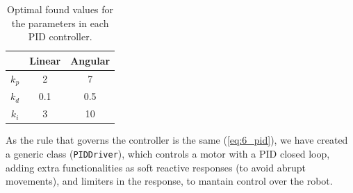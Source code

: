 			\begin{table}[h]
				\centering
				\begin{tabular}{|c|c|c|}
					\hline
					\textbf{} & \textbf{Linear} & \textbf{Angular} \\ \hline
					$k_p$     & 2               & 7                \\ \hline
					$k_d$     & 0.1             & 0.5              \\ \hline
					$k_i$     & 3               & 10               \\ \hline
				\end{tabular}
				\caption{Optimal found values for the parameters in each PID controller.}
				\label{tab:6_pids}
			\end{table}
			
			As the rule that governs the controller is the same (\autoref{eq:6_pid}), we have created a generic class (\texttt{PIDDriver}), which controls a motor with a PID closed loop, adding extra functionalities as soft reactive responses (to avoid abrupt movements), and limiters in the response, to mantain control over the robot.\\
			
			
			
